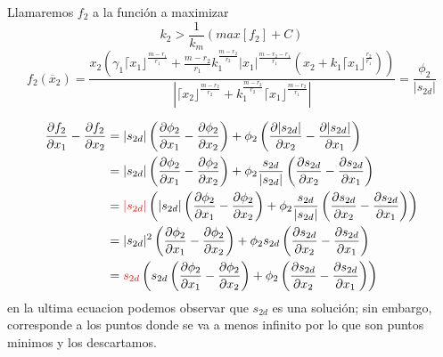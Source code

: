    Llamaremos $f_2$ a la función a maximizar
   \begin{equation*}
     k_2> \frac{1}{k_m}\left( max\left[f_2 \right] + C \right)
   \end{equation*}
   \begin{equation}
       f_2(\overline{x}_2) =  \frac{x_2\left(\gamma_1 \lceil x_1 \rfloor^{\frac{m-r_1}{r_1}} + \frac{m-r_2}{r_1} k_1^{\frac{m-r_2}{r_2}}  | x_1|^{\frac{m-r_2-r_1}{r_1}}  \left(x_2 +k_1\lceil x_1 \rfloor^{\frac{r_2}{r_1}} \right) \right)} {\left|\lceil x_2 \rfloor^{\frac{m-r_2}{r_2}}+k_1^{\frac{m-r_2}{r_2}}\lceil x_1 \rfloor^{\frac{m-r_2}{r_1}}\right|}= \frac{\phi_2}{|s_{2d}|}
   \end{equation}

   \begin{equation}
    \begin{split}
      \frac{\partial f_2}{\partial x_1}- \frac{\partial f_2}{\partial x_2}&=|s_{2d}|\left( \frac{\partial \phi_2}{\partial x_1}-\frac{\partial \phi_2}{\partial x_2}\right) + \phi_2\left(\frac{\partial |s_{2d}|}{\partial x_2}-\frac{\partial |s_{2d}|}{\partial x_1}\right)\\
      &=|s_{2d}|\left( \frac{\partial \phi_2}{\partial x_1}-\frac{\partial \phi_2}{\partial x_2}\right) + \phi_2 \frac{s_{2d}}{|s_{2d}|}  \left(\frac{\partial s_{2d}}{\partial x_2}-\frac{\partial s_{2d}}{\partial x_1}\right)  \\
      &=\textcolor{red}{|s_{2d}|} \left(  |s_{2d}|\left( \frac{\partial \phi_2}{\partial x_1}-\frac{\partial \phi_2}{\partial x_2}\right) + \phi_2 \frac{s_{2d}}{|s_{2d}|}  \left(\frac{\partial s_{2d}}{\partial x_2}-\frac{\partial s_{2d}}{\partial x_1}\right)\right)  \\
      &= |s_{2d}|^2\left( \frac{\partial \phi_2}{\partial x_1}-\frac{\partial \phi_2}{\partial x_2}\right) + \phi_2 s_{2d}  \left(\frac{\partial s_{2d}}{\partial x_2}-\frac{\partial s_{2d}}{\partial x_1}\right) \\
      &=\textcolor{red}{s_{2d}} \left(  s_{2d}\left( \frac{\partial \phi_2}{\partial x_1}-\frac{\partial \phi_2}{\partial x_2}\right) + \phi_2  \left(\frac{\partial s_{2d}}{\partial x_2}-\frac{\partial s_{2d}}{\partial x_1}\right)\right)  \\
    \end{split}
  \end{equation}
  en la ultima ecuacion podemos observar que $s_{2d}$ es una solución; sin embargo, corresponde a los puntos donde se va a menos infinito por lo que son puntos minimos y los descartamos.
   
